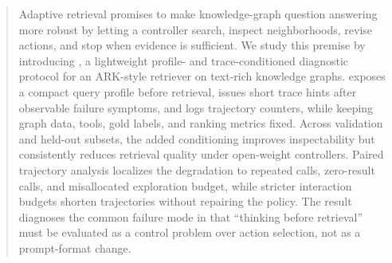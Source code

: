 \begin{abstract}
Adaptive retrieval promises to make knowledge-graph question answering more robust by letting a controller search, inspect neighborhoods, revise actions, and stop when evidence is sufficient. We study this premise by introducing \textbf{\tb}, a lightweight profile- and trace-conditioned diagnostic protocol for an ARK-style retriever on text-rich knowledge graphs. \tb exposes a compact query profile before retrieval, issues short trace hints after observable failure symptoms, and logs trajectory counters, while keeping graph data, tools, gold labels, and ranking metrics fixed. Across \stark validation and held-out subsets, the added conditioning improves inspectability but consistently reduces retrieval quality under open-weight controllers. Paired trajectory analysis localizes the degradation to repeated calls, zero-result calls, and misallocated exploration budget, while stricter interaction budgets shorten trajectories without repairing the policy. The result diagnoses the common failure mode in that ``thinking before retrieval'' must be evaluated as a control problem over action selection, not as a prompt-format change.
\end{abstract}
